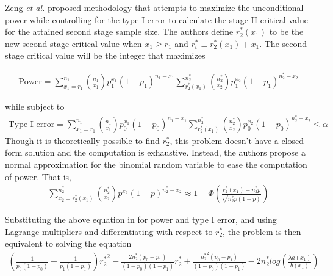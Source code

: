 \documentclass[12pt]{report}\usepackage[]{graphicx}\usepackage[]{color}
\newlength{\li}\setlength{\li}{14.48pt}
\newlength{\di}\setlength{\di}{-3.5mm}
\begin{document}
\indent Zeng \textit{et al.} \cite{Zeng} proposed methodology that attempts to maximize the unconditional power while controlling for the type I error to calculate the stage II critical value for the attained second stage sample size. The authors define $r_2^\ast(x_1)$ to be the new second stage critical value when $x_1 \geq r_1$ and $r_t^\ast \equiv r_2^\ast(x_1) + x_1$. The second stage critical value will be the integer that maximizes 

\begin{equation}
\begin{aligned}
\mbox{Power} = \sum_{x_1 = r_1}^{n_1} {n_1 \choose x_1} p_1^{x_1} (1-p_1)^{n_1 - x_1} \sum_{r_2^\ast(x_1)}^{n_2^\ast} {n_2^\ast \choose x_2} p_1^{x_2} (1-p_1)^{{n_2^\ast}-x_2}
\end{aligned}
\end{equation}

while subject to 
\begin{equation}
\begin{aligned}
 \mbox{Type I error} = \sum_{x_1 = r_1}^{n_1} {n_1 \choose x_1} p_0^{x_1} (1-p_0)^{n_1 - x_1} \sum_{r_2^\ast(x_1)}^{n_2^\ast} {n_2^\ast \choose x_2} p_0^{x_2}(1-p_0)^{{n_2^\ast}-x_2} \leq \alpha
\end{aligned}
\end{equation}
Though it is theoretically possible to find $r_2^\ast$, this problem doesn't have a closed form solution and the computation is exhaustive. Instead, the authors propose a normal approximation for the binomial random variable to ease the computation of power. That is, 
\begin{equation}
\begin{aligned}
\sum_{x_2 = r_2^\ast(x_1)}^{n_2^\ast} {n_2^\ast \choose x_2} p^{x_2} (1-p)^{n_2^\ast - x_2} \approx 1-\Phi \left(\frac{r_2^\ast(x_1) - n_2^\ast p}{\sqrt{n_2^\ast p(1-p)}} \right)
\end{aligned}
\end{equation}

Substituting the above equation in for power and type I error, and using Lagrange multipliers and differentiating with respect to $r_2^\ast$, the problem is then equivalent to solving the equation 
\begin{equation}
\begin{aligned}
\left(\frac{1}{p_0(1-p_0)} - \frac{1}{p_1(1-p_1)} \right) {r_2^\ast}^2 - \frac{2 n_2^\ast (p_0 - p_1)}{(1-p_0)(1-p_1)}r_2^\ast + \frac{{n_2^\ast}^2(p_0-p_1)}{(1-p_0)(1-p_1)}-2n_2^\ast log \left(\frac{\lambda a(x_1)}{b(x_1)}\right)
\end{aligned}
\end{equation}
\end{document}
